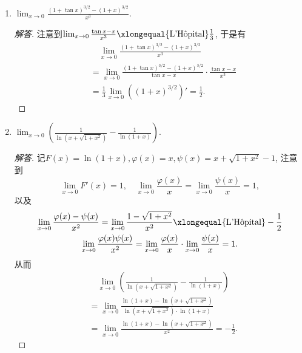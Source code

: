 \begin{2a}
\begin{enumerate}
\begin{enumerate}[label=(\arabic*)]
\begin{proof}[解答]
注意到\(\lim_{x\rightarrow 0}\frac{\sin x-\ln(1+x)}{x^2}\xlongequal{\text{L'H\^{o}pital}}\frac{1}{2}\), 于是有
\[\begin{split}
&\quad\lim_{x\rightarrow 0}\frac{\arctan(\sin x)-\arctan(\ln (1+x))}{x^2}\\
&=\lim_{x\rightarrow 0}\frac{\arctan(\sin x)-\arctan(\ln (1+x))}{\sin x-\ln(1+x)}\cdot\frac{\sin x-\ln(1+x)}{x^2}\\
&=\frac{1}{2}\lim_{x\rightarrow 0}\left(\arctan x\right)'=\frac{1}{2}.
\end{split}\]
\end{proof}
\item \(\lim_{x\rightarrow 0}\frac{(1+\tan x)^{3/2}-(1+x)^{3/2}}{x^3}.\)
\begin{proof}[解答]
注意到\(\lim_{x\rightarrow 0}\frac{\tan x-x}{x^3}\xlongequal{\text{L'H\^{o}pital}}\frac{1}{3}\), 于是有
\[\begin{aligned}
&\quad\lim_{x\rightarrow 0}\frac{(1+\tan x)^{3/2}-(1+x)^{3/2}}{x^3}\\
&=\lim_{x\rightarrow 0}\frac{(1+\tan x)^{3/2}-(1+x)^{3/2}}{\tan x-x}\cdot\frac{\tan x-x}{x^3}\\
&=\frac{1}{3}\lim_{x\rightarrow 0}\left((1+x)^{3/2}\right)'=\frac{1}{2}.
\end{aligned}\]
\end{proof}
\item \(\lim_{x\rightarrow 0}\left(\frac{1}{\ln (x+\sqrt{1+x^2})}-\frac{1}{\ln(1+x)}\right).\)
\begin{proof}[解答]
记\(F(x)=\ln(1+x),\varphi(x)=x,\psi(x)=x+\sqrt{1+x^2}-1\), 注意到
\[\lim_{x\rightarrow 0}F'(x)=1,\quad\lim_{x\rightarrow 0}\frac{\varphi(x)}{x}
=\lim_{x\rightarrow 0}\frac{\psi(x)}{x}=1,\]
以及\begin{gather*}
\lim_{x\rightarrow 0}\frac{\varphi(x)-\psi(x)}{x^2}
=\lim_{x\rightarrow 0}\frac{1-\sqrt{1+x^2}}{x^2}
\xlongequal{\text{L'H\^{o}pital}}-\frac{1}{2}\\
\lim_{x\rightarrow 0}\frac{\varphi(x)\psi(x)}{x^2}
=\lim_{x\rightarrow 0}\frac{\varphi(x)}{x}\cdot\lim_{x\rightarrow 0}\frac{\psi(x)}{x}=1.
\end{gather*}
从而\[\begin{aligned}
&\quad\lim_{x\rightarrow 0}\left(\frac{1}{\ln (x+\sqrt{1+x^2})}-\frac{1}{\ln(1+x)}\right)\\
&=\lim_{x\rightarrow 0}\frac{\ln(1+x)-\ln\left(x+\sqrt{1+x^2}\right)}{\ln (x+\sqrt{1+x^2})\cdot\ln(1+x)}\\
&=\lim_{x\rightarrow 0}\frac{\ln(1+x)-\ln\left(x+\sqrt{1+x^2}\right)}{x^2}=-\frac{1}{2}.

\end{aligned}\]
\end{proof}
\end{enumerate}
\end{enumerate}
\end{2a}
